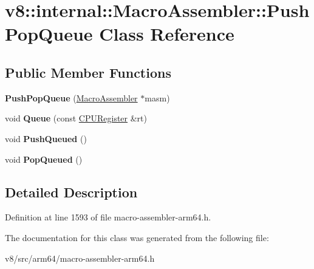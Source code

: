\hypertarget{classv8_1_1internal_1_1MacroAssembler_1_1PushPopQueue}{}\section{v8\+:\+:internal\+:\+:Macro\+Assembler\+:\+:Push\+Pop\+Queue Class Reference}
\label{classv8_1_1internal_1_1MacroAssembler_1_1PushPopQueue}
\subsection*{Public Member Functions}
\begin{DoxyCompactItemize}
\item 
\mbox{\label{classv8_1_1internal_1_1MacroAssembler_1_1PushPopQueue_a1324ad042bbe6fe7b28adb03648483b3}} 
{\bfseries Push\+Pop\+Queue} (\mbox{\hyperlink{classv8_1_1internal_1_1MacroAssembler}{Macro\+Assembler}} $\ast$masm)
\item 
\mbox{\label{classv8_1_1internal_1_1MacroAssembler_1_1PushPopQueue_a15f821a408ba2d66324531309d3b9a77}} 
void {\bfseries Queue} (const \mbox{\hyperlink{classv8_1_1internal_1_1CPURegister}{C\+P\+U\+Register}} \&rt)
\item 
\mbox{\label{classv8_1_1internal_1_1MacroAssembler_1_1PushPopQueue_a0fc770acb8fddb2cdd9f580d6de38352}} 
void {\bfseries Push\+Queued} ()
\item 
\mbox{\label{classv8_1_1internal_1_1MacroAssembler_1_1PushPopQueue_a4cd0b4ebc6a533ac64a1c03c9c67265e}} 
void {\bfseries Pop\+Queued} ()
\end{DoxyCompactItemize}


\subsection{Detailed Description}


Definition at line 1593 of file macro-\/assembler-\/arm64.\+h.



The documentation for this class was generated from the following file\+:\begin{DoxyCompactItemize}
\item 
v8/src/arm64/macro-\/assembler-\/arm64.\+h\end{DoxyCompactItemize}
